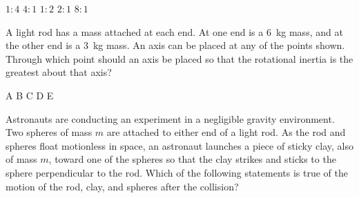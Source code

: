 \documentclass{../../../oss-ap12ibhl-print}
\begin{document}
\begin{questions}
  \begin{minipage}{.35\linewidth}
    \end{minipage}
  \begin{minipage}{.3\linewidth}
    \begin{choices}
      \choice $1:4$
      \choice $4:1$
      \choice $1:2$
      \choice $2:1$
      \choice $8:1$
    \end{choices}
  \end{minipage}
  
  \question A light rod has a mass attached at each end. At one end is a
  \SI{6}{\kilo\gram} mass, and at the other end is a \SI{3}{\kilo\gram} mass.
  An axis can be placed at any of the points shown. Through which point should
  an axis be placed so that the rotational inertia is the greatest about that
  axis?
  \begin{center}
  \end{center}
  \begin{oneparchoices}
    \choice A\hspace{.4in}
    \choice B\hspace{.4in}
    \choice C\hspace{.4in}
    \choice D\hspace{.4in}
    \choice E
  \end{oneparchoices}
    
  \question Astronauts are conducting an experiment in a negligible gravity
  environment. Two spheres of mass $m$ are attached to either end of a light
  rod. As the rod and spheres float motionless in space, an astronaut launches
  a piece of sticky clay, also of mass $m$, toward one of the spheres so that
  the clay strikes and sticks to the sphere perpendicular to the rod. Which of
  the following statements is true of the motion of the rod, clay, and spheres
  after the collision?


\end{questions}
\end{document}
